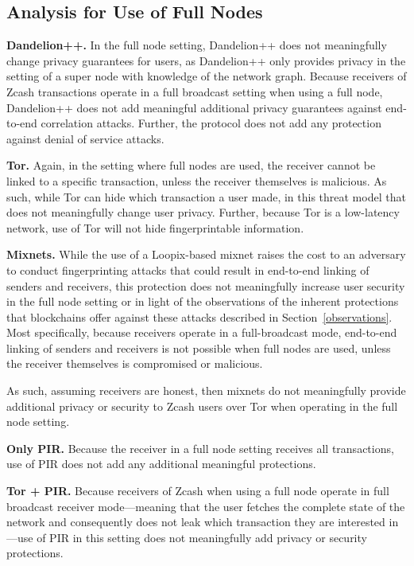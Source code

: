 \documentclass{article}
\begin{document}
\subsection{Analysis for Use of Full Nodes}

\textbf{Dandelion++.}
In the full node setting, Dandelion++ does not meaningfully change privacy
guarantees for users, as Dandelion++ only provides privacy in the setting of a
super node with knowledge of the network graph. Because receivers of
Zcash transactions operate in a full broadcast setting when using a full node,
Dandelion++ does not add meaningful additional privacy guarantees against
end-to-end correlation attacks. Further, the protocol does not add any
protection against denial of service attacks.

\textbf{Tor.}
Again, in the setting where full nodes are used, the receiver cannot be linked
to a specific transaction, unless the receiver themselves is malicious. As
such, while Tor can hide which transaction a user made, in this threat model
that does not meaningfully change user privacy. Further, because Tor is a
low-latency network, use of Tor will not hide fingerprintable information.

\textbf{Mixnets.}
While the use of a Loopix-based mixnet raises the cost to an adversary to
conduct fingerprinting attacks that could result in end-to-end linking of
senders and receivers, this protection does not meaningfully increase user
security in the full node setting or in light of the observations of the
inherent protections that blockchains offer against these attacks described in
Section~\ref{observations}. Most specifically, because receivers operate in a
full-broadcast mode, end-to-end linking of senders and receivers is not
possible when full nodes are used, unless the receiver themselves is
compromised or malicious.

As such, assuming receivers are honest, then mixnets do not meaningfully provide
additional privacy or security to Zcash users over Tor when operating in the
full node setting.

\textbf{Only PIR.}
Because the receiver in a full node setting receives all transactions, use of
PIR does not add any additional meaningful protections.

\textbf{Tor + PIR.}
Because receivers of Zcash when using a full node operate in full broadcast
receiver mode---meaning that the user fetches the complete state of the network
and consequently does not leak which transaction they are interested in---use
of PIR in this setting does not meaningfully add privacy or security
protections.
\end{document}
